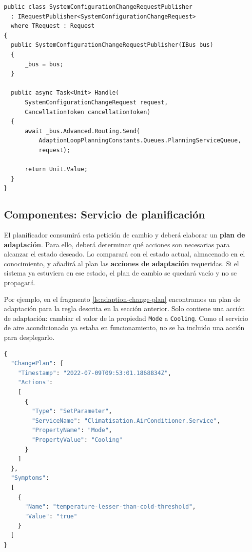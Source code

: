 \begin{lstlisting}[caption={Las peticiones asíncronas se publican a una cola determinada.\protect\footnotemark},captionpos=b, label=ls:request-publisher]
public class SystemConfigurationChangeRequestPublisher
  : IRequestPublisher<SystemConfigurationChangeRequest>
  where TRequest : Request
{
  public SystemConfigurationChangeRequestPublisher(IBus bus)
  {
      _bus = bus;
  }

  public async Task<Unit> Handle(
      SystemConfigurationChangeRequest request,
      CancellationToken cancellationToken)
  {
      await _bus.Advanced.Routing.Send(
          AdaptionLoopPlanningConstants.Queues.PlanningServiceQueue,
          request);

      return Unit.Value;
  }
}
\end{lstlisting}



\subsection{Componentes: Servicio de planificación}

El planificador consumirá esta petición de cambio y deberá elaborar un \textbf{plan de adaptación}. Para ello, deberá determinar qué acciones son necesarias para alcanzar el estado deseado. Lo comparará con el estado actual, almacenado en el conocimiento, y añadirá al plan las \textbf{acciones de adaptación} requeridas. Si el sistema ya estuviera en ese estado, el plan de cambio se quedará vacío y no se propagará.

Por ejemplo, en el fragmento \ref{ls:adaption-change-plan} encontramos un plan de adaptación para la regla descrita en la sección anterior. Solo contiene una acción de adaptación: cambiar el valor de la propiedad \texttt{Mode} a \texttt{Cooling}. Como el servicio de aire acondicionado ya estaba en funcionamiento, no se ha incluido una acción para desplegarlo.

\begin{lstlisting}[language=python,caption={Plan de adaptación generado para la regla anterior. Solo contiene una acción de adaptación: cambiar la configuración \texttt{Mode} del servicio \texttt{AirConditioner}.},captionpos=b, label=ls:adaption-change-plan]
{
  "ChangePlan": {
    "Timestamp": "2022-07-09T09:53:01.1868834Z",
    "Actions":
    [
      {
        "Type": "SetParameter",
        "ServiceName": "Climatisation.AirConditioner.Service",
        "PropertyName": "Mode",
        "PropertyValue": "Cooling"
      }
    ]
  },
  "Symptoms":
  [
    {
      "Name": "temperature-lesser-than-cold-threshold",
      "Value": "true"
    }
  ]
}
\end{lstlisting}


